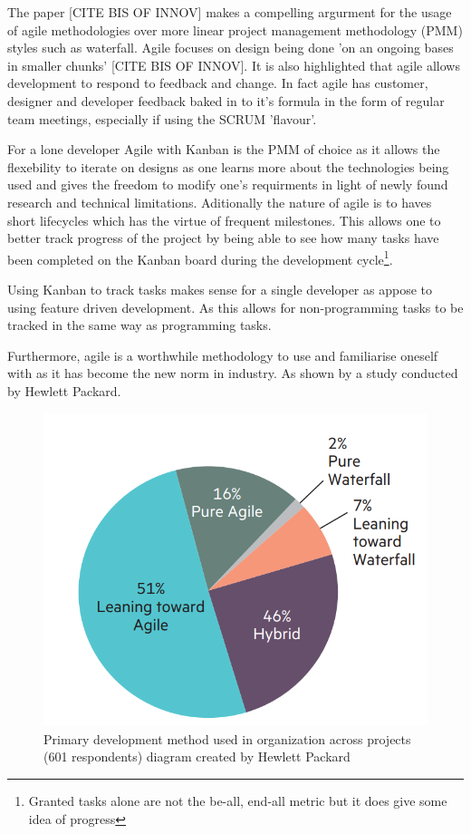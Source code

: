 The paper [CITE BIS OF INNOV] makes a compelling argurment for the usage of agile methodologies over more linear project management methodology (PMM) styles such as waterfall. Agile focuses on design being done 'on an ongoing bases in smaller chunks' [CITE BIS OF INNOV]. It is also highlighted that agile allows development to respond to feedback and change. In fact agile has customer, designer and developer feedback baked in to it's formula in the form of regular team meetings, especially if using the SCRUM 'flavour'.
\par
For a lone developer Agile with Kanban is the PMM of choice as it allows the flexebility to iterate on designs as one learns more about the technologies being used and gives the freedom to modify one's requirments in light of newly found research and technical limitations. Aditionally the nature of agile is to haves short lifecycles which has the virtue of frequent milestones. This allows one to better track progress of the project by being able to see how many tasks have been completed on the Kanban board during the development cycle\footnote[4]{Granted tasks alone are not the be-all, end-all metric but it does give some idea of progress}.
\par
Using Kanban to track tasks makes sense for a single developer as appose to using feature driven development. As this allows for non-programming tasks to be tracked in the same way as programming tasks.
\par
Furthermore, agile is a worthwhile methodology to use and familiarise oneself with as it has become the new norm in industry. As shown by a study conducted by Hewlett Packard.
\begin{figure}[H]
  \begin{center}
    \includegraphics[scale=0.4]{Images/PMMPieChart}
    \caption{Primary development method used in organization across projects (601 respondents) diagram created by Hewlett Packard}
    \label{fig:PMM_PieChart}
  \end{center}
\end{figure}

